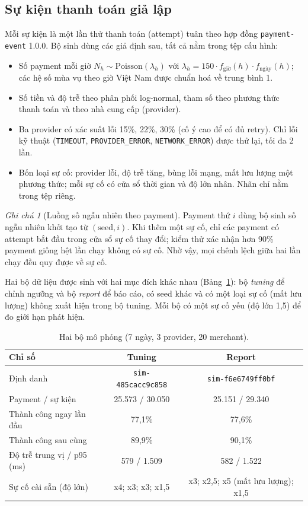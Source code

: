 \documentclass[11pt,a4paper]{article}
\theoremstyle{definition}
\theoremstyle{remark}
\newtheorem{remark}{Ghi chú}
\newcommand{\code}[1]{\texttt{#1}}
\numberwithin{equation}{section}
\begin{document}
\subsection{Sự kiện thanh toán giả lập}\label{sec:sim}
Mỗi sự kiện là một lần thử thanh toán (attempt) tuân theo hợp đồng \code{payment-event} 1.0.0. Bộ sinh dùng các giả định sau, tất cả nằm trong tệp cấu hình:
\begin{itemize}
  \item Số payment mỗi giờ $N_h\sim\mathrm{Poisson}(\lambda_h)$ với $\lambda_h=150\cdot f_{\text{giờ}}(h)\cdot f_{\text{ngày}}(h)$; các hệ số mùa vụ theo giờ Việt Nam được chuẩn hoá về trung bình 1.
  \item Số tiền và độ trễ theo phân phối log-normal, tham số theo phương thức thanh toán và theo nhà cung cấp (provider).
  \item Ba provider có xác suất lỗi 15\%, 22\%, 30\% (cố ý cao để có đủ retry). Chỉ lỗi kỹ thuật (\code{TIMEOUT}, \code{PROVIDER\_ERROR}, \code{NETWORK\_ERROR}) được thử lại, tối đa 2 lần.
  \item Bốn loại sự cố: provider lỗi, độ trễ tăng, bùng lỗi mạng, mất lưu lượng một phương thức; mỗi sự cố có cửa sổ thời gian và độ lớn nhân. Nhãn chỉ nằm trong tệp riêng.
\end{itemize}

\begin{remark}[Luồng số ngẫu nhiên theo payment]
Payment thứ $i$ dùng bộ sinh số ngẫu nhiên khởi tạo từ $(\text{seed}, i)$. Khi thêm một sự cố, chỉ các payment có attempt bắt đầu trong cửa sổ sự cố thay đổi; kiểm thử xác nhận hơn 90\% payment giống hệt lần chạy không có sự cố. Nhờ vậy, mọi chênh lệch giữa hai lần chạy đều quy được về sự cố.
\end{remark}

Hai bộ dữ liệu được sinh với hai mục đích khác nhau (Bảng~\ref{tab:sim}): bộ \emph{tuning} để chỉnh ngưỡng và bộ \emph{report} để báo cáo, có seed khác và có một loại sự cố (mất lưu lượng) không xuất hiện trong bộ tuning. Mỗi bộ có một sự cố yếu (độ lớn 1,5) để đo giới hạn phát hiện.

\begin{table}[H]\centering
\caption{Hai bộ mô phỏng (7 ngày, 3 provider, 20 merchant).}\label{tab:sim}
\begin{tabular}{@{}lcc@{}}
\toprule
Chỉ số & Tuning & Report \\ \midrule
Định danh & \code{sim-485cacc9c858} & \code{sim-f6e6749ff0bf} \\
Payment / sự kiện & 25.573 / 30.050 & 25.151 / 29.340 \\
Thành công ngay lần đầu & 77,1\% & 77,6\% \\
Thành công sau cùng & 89,9\% & 90,1\% \\
Độ trễ trung vị / p95 (ms) & 579 / 1.509 & 582 / 1.522 \\
Sự cố cài sẵn (độ lớn) & x4; x3; x3; x1,5 & x3; x2,5; x5 (mất lưu lượng); x1,5 \\ \bottomrule
\end{tabular}
\end{table}
\end{document}
